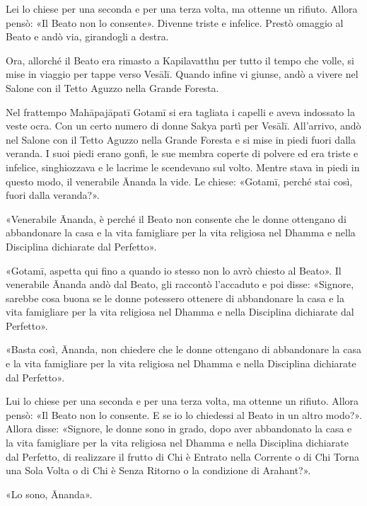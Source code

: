 Lei lo chiese per una seconda e per una terza volta, ma ottenne un rifiuto.
Allora pensò: «Il Beato non lo consente». Divenne triste e infelice. Prestò
omaggio al Beato e andò via, girandogli a destra.

Ora, allorché il Beato era rimasto a Kapilavatthu per tutto il tempo che volle,
si mise in viaggio per tappe verso Vesālī. Quando infine vi giunse, andò a
vivere nel Salone con il Tetto Aguzzo nella Grande Foresta.

Nel frattempo Mahāpajāpatī Gotamī si era tagliata i capelli e aveva indossato la
veste ocra. Con un certo numero di donne Sakya partì per Vesālī. All’arrivo,
andò nel Salone con il Tetto Aguzzo nella Grande Foresta e si mise in piedi
fuori dalla veranda. I suoi piedi erano gonfi, le sue membra coperte di polvere
ed era triste e infelice, singhiozzava e le lacrime le scendevano sul volto.
Mentre stava in piedi in questo modo, il venerabile Ānanda la vide. Le chiese:
«Gotamī, perché stai così, fuori dalla veranda?».

«Venerabile Ānanda, è perché il Beato non consente che le donne ottengano di
abbandonare la casa e la vita famigliare per la vita religiosa nel Dhamma e
nella Disciplina dichiarate dal Perfetto».

«Gotamī, aspetta qui fino a quando io stesso non lo avrò chiesto al Beato». Il
venerabile Ānanda andò dal Beato, gli raccontò l’accaduto e poi disse: «Signore,
sarebbe cosa buona se le donne potessero ottenere di abbandonare la casa e la
vita famigliare per la vita religiosa nel Dhamma e nella Disciplina dichiarate
dal Perfetto».

«Basta così, Ānanda, non chiedere che le donne ottengano di abbandonare la casa
e la vita famigliare per la vita religiosa nel Dhamma e nella Disciplina
dichiarate dal Perfetto».

Lui lo chiese per una seconda e per una terza volta, ma ottenne un rifiuto.
Allora pensò: «Il Beato non lo consente. E se io lo chiedessi al Beato in un
altro modo?». Allora disse: «Signore, le donne sono in grado, dopo aver
abbandonato la casa e la vita famigliare per la vita religiosa nel Dhamma e
nella Disciplina dichiarate dal Perfetto, di realizzare il frutto di Chi è
Entrato nella Corrente o di Chi Torna una Sola Volta o di Chi è Senza Ritorno o
la condizione di Arahant?».

«Lo sono, Ānanda».

